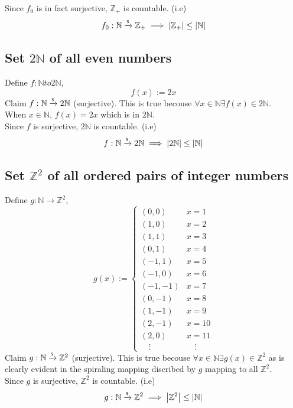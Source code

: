 \documentclass[]{article}
\newcommand{\N}{\mathbb{N}}
\newcommand{\Z}{\mathbb{Z}}
\newcommand{\toS}{\xrightarrow{\textsf{\tiny S}}}
\begin{document}
Since $f_0$ is in fact surjective, $\Z_+$ is countable. (i.e)
$$f_0 : \N \toS \Z_+ \implies \abs{\Z_+} \leq \abs{\N}$$

\subsection{Set $2\N$ of all even numbers}
Define $f : \N to 2\N$,
\begin{displaymath}
	f(x) := 2x
\end{displaymath}
Claim $f : \N \toS 2\N$ (surjective).
This is true becouse $\forall x \in \N \exists f(x) \in 2\N$.\\
When $x \in \N$, $f(x) = 2 x$ which is in $2 \N$.\\

Since $f$ is surjective, $2\N$ is countable. (i.e)
$$f : \N \toS 2\N \implies \abs{2\N} \leq \abs{\N}$$

\subsection{Set $\Z^2$ of all ordered pairs of integer numbers}
Define $g : \N \to \Z^2$,
\begin{displaymath}
	g(x) :=
	\begin{cases}
		(0,0)	& x = 1\\
		(1,0)	& x = 2\\
		(1,1)	& x = 3\\
		(0,1)	& x = 4\\
		(-1,1)	& x = 5\\
		(-1,0)	& x = 6\\
		(-1,-1)	& x = 7\\
		(0,-1)	& x = 8\\
		(1,-1)	& x = 9\\
		(2,-1)	& x = 10\\
		(2,0)	& x = 11\\
		\quad \vdots & \quad \vdots
	\end{cases}
\end{displaymath}
Claim $g : \N \toS \Z^2$ (surjective).
This is true becouse $\forall x \in \N \exists g(x) \in \Z^2$ as is 
clearly evident in the spiraling mapping discribed by $g$ mapping to all $\Z^2$.\\

Since $g$ is surjective, $\Z^2$ is countable. (i.e)
$$g : \N \toS \Z^2 \implies \abs{\Z^2} \leq \abs{\N}$$

\newpage
\end{document}
